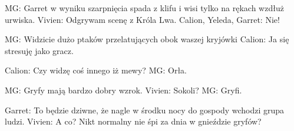 \documentclass[10pt,twoside,twocolumn]{book}
\begin{document}
%    
%       
MG: Garret w wyniku szarpnięcia spada z klifu i wisi tylko na rękach wzdłuż urwiska.
Vivien: Odgrywam scenę z Króla Lwa.
Calion, Yeleda, Garret: Nie!

%    
%       
MG: Widzicie dużo ptaków przelatujących obok waszej kryjówki
Calion: Ja się stresuję jako gracz.

%    
%       
Calion: Czy widzę coś innego iż mewy?
MG: Orła.

%    
%       
MG: Gryfy mają bardzo dobry wzrok.
Vivien: Sokoli?
MG: Gryfi.

%    
%       
Garret: To będzie dziwne, że nagle w środku nocy do gospody wchodzi grupa ludzi.
Vivien: A co? Nikt normalny nie śpi za dnia w gnieździe gryfów?
\end{document}
